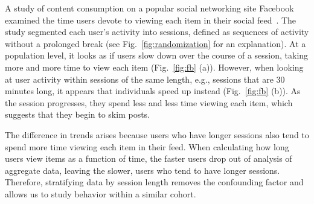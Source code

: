 \documentclass{svjour3}
\begin{document}
A study of content consumption on a popular social networking site Facebook examined the time users devote to viewing each item in their social feed~\cite{KootiA2017www}. The study segmented each user's activity into sessions, defined as sequences of activity without a prolonged break (see Fig.~\ref{fig:randomization} for an explanation). At a population level, it looks as if users slow down over the course of a session, taking more and more time to view each item (Fig.~\ref{fig:fb} (a)). However, when looking at user activity within sessions of the same length, e.g., sessions that are 30 minutes long, it appears that individuals speed up instead (Fig.~\ref{fig:fb} (b)). As the session progresses, they spend less and less time viewing each item, which suggests that they begin to skim posts.

The difference in trends arises because users who have longer sessions also tend to spend more time viewing each item in their feed. When calculating how long users view items as a function of time, the faster users drop out of analysis of aggregate data, leaving the slower, users who tend to have longer sessions. Therefore, stratifying data by session length removes the confounding factor and allows us to study behavior within a similar cohort.

%
\end{document}
